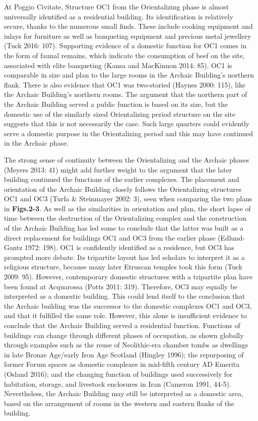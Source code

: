 At Poggio Civitate, Structure OC1 from the Orientalizing phase is almost
universally identified as a residential building. Its identification is
relatively secure, thanks to the numerous small finds. These include
cooking equipment and inlays for furniture as well as banqueting
equipment and precious metal jewellery (Tuck 2016: 107). Supporting
evidence of a domestic function for OC1 comes in the form of faunal
remains, which indicate the consumption of beef on the site, associated
with elite banqueting (Kansa and MacKinnon 2014: 85). OC1 is comparable
in size and plan to the large rooms in the Archaic Building's northern
flank. There is also evidence that OC1 was two-storied (Haynes 2000:
115), like the Archaic Building's northern rooms. The argument that the
northern part of the Archaic Building served a public function is based
on its size, but the domestic use of the similarly sized Orientalizing
period structure on the site suggests that this is not necessarily the
case. Such large quarters could evidently serve a domestic purpose in
the Orientalizing period and this may have continued in the Archaic
phase.

The strong sense of continuity between the Orientalizing and the Archaic
phases (Meyers 2013: 41) might add further weight to the argument that
the later building continued the functions of the earlier complexes. The
placement and orientation of the Archaic Building closely follows the
Orientalizing structures OC1 and OC3 (Turfa \& Steinmayer 2002: 3), seen
when comparing the two plans in \textbf{Figs.2-3}. As well as the
similarities in orientation and plan, the short lapse of time between
the destruction of the Orientalizing complex and the construction of the
Archaic Building has led some to conclude that the latter was built as a
direct replacement for buildings OC1 and OC3 from the earlier phase
(Edlund-Gantz 1972: 198). OC1 is confidently identified as a residence,
but OC3 has prompted more debate. Its tripartite layout has led scholars
to interpret it as a religious structure, because many later Etruscan
temples took this form (Tuck 2009: 95). However, contemporary domestic
structures with a tripartite plan have been found at Acquarossa (Potts
2011: 319). Therefore, OC3 may equally be interpreted as a domestic
building. This could lend itself to the conclusion that the Archaic
building was the successor to the domestic complexes OC1 and OC3, and
that it fulfilled the same role. However, this alone is insufficient
evidence to conclude that the Archaic Building served a residential
function. Functions of buildings can change through different phases of
occupation, as shown globally through examples such as the reuse of
Neolithic-era chamber tombs as dwellings in late Bronze Age/early Iron
Age Scotland (Hingley 1996); the repurposing of former Forum spaces as
domestic complexes in mid-fifth century AD Emerita (Osland 2016); and
the changing function of buildings used successively for habitation,
storage, and livestock enclosures in Iran (Cameron 1991, 44-5).
Nevertheless, the Archaic Building may still be interpreted as a
domestic area, based on the arrangement of rooms in the western and
eastern flanks of the building.

